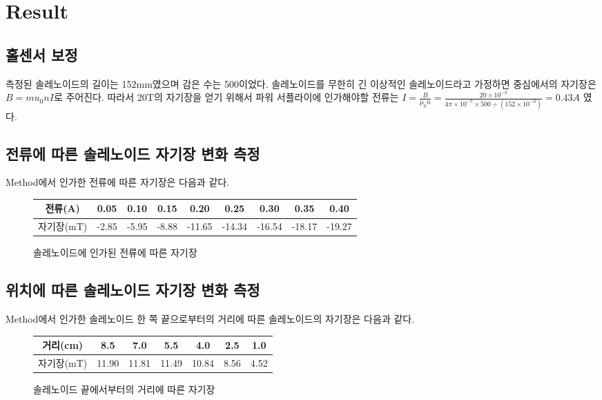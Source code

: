 \documentclass[a4paper]{article}
\begin{document}
\section{Result}
	\subsection{홀센서 보정}
		측정된 솔레노이드의 길이는 152\si{mm}였으며 감은 수는 500이었다.
		솔레노이드를 무한히 긴 이상적인 솔레노이드라고 가정하면 중심에서의 자기장은 $B = mu_{0} n I$로 주어진다.
		따라서 20\si{T}의 자기장을 얻기 위해서 파워 서플라이에 인가해야할 전류는 $I = \frac{B}{\mu_{0} n} = \frac{20 \times 10^{-3}}{4\pi \times 10^{-7} \times 500 \div (152 \times 10^{-3})} = 0.43\si{A}$ 였다.

	\subsection{전류에 따른 솔레노이드 자기장 변화 측정}
		Method에서 인가한 전류에 따른 자기장은 다음과 같다.
		\begin{figure}[h]
			\centering
			\begin{tabular}{c|cccccccc}
				\hline \hline
				전류(\si{A}) & 0.05 & 0.10 & 0.15 & 0.20 & 0.25 & 0.30 & 0.35 & 0.40 \\
				\hline
				자기장(\si{mT}) & -2.85 & -5.95 & -8.88 & -11.65 & -14.34 & -16.54 & -18.17 & -19.27 \\
				\hline \hline 
			\end{tabular}
			\caption{솔레노이드에 인가된 전류에 따른 자기장}
			\label{tab:solire}
		\end{figure}

	\subsection{위치에 따른 솔레노이드 자기장 변화 측정}
		Method에서 인가한 솔레노이드 한 쪽 끝으로부터의 거리에 따른 솔레노이드의 자기장은 다음과 같다.
		\begin{figure}[h]
			\centering
			\begin{tabular}{c|cccccc}
				\hline \hline
				거리(\si{cm}) & 8.5 & 7.0 & 5.5 & 4.0 & 2.5 & 1.0 \\
				\hline
				자기장(\si{mT}) & 11.90 & 11.81 & 11.49 & 10.84 & 8.56 & 4.52 \\
				\hline \hline
			\end{tabular}
			\caption{솔레노이드 끝에서부터의 거리에 따른 자기장}
			\label{tab:soldre}
		\end{figure}
\end{document}

